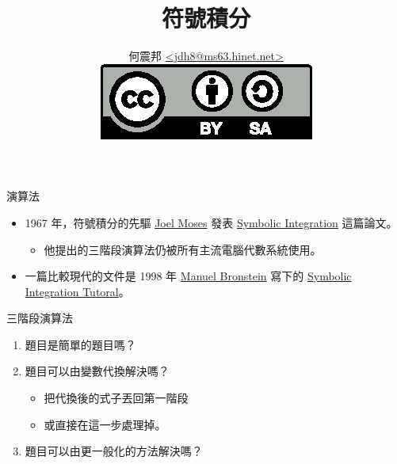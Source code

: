 \documentclass{beamer}
\theoremstyle{remark}
\begin{document}
\title{符號積分}
\author[何震邦]{何震邦 \href{mailto:jdh8@ms63.hinet.net}{\textless jdh8@ms63.hinet.net\textgreater}\\
    \href{http://creativecommons.org/licenses/by-sa/3.0/tw/deed.zh\textunderscore TW}{\includegraphics{by-sa.eps}}}

\maketitle

\begin{frame}{演算法}
  \begin{itemize}
    \item 1967 年，符號積分的先驅 \href{http://en.wikipedia.org/wiki/Joel\textunderscore Moses}{Joel Moses} 發表
      \href{http://www.softwarepreservation.org/projects/LISP/MIT/MIT-LCS-TR-047-corrected-ocr.pdf}{Symbolic Integration}
      這篇論文。
      \begin{itemize}
	\item 他提出的三階段演算法仍被所有主流電腦代數系統使用。
      \end{itemize}
    \item 一篇比較現代的文件是 1998 年
      \href{http://www-sop.inria.fr/cafe/Manuel.Bronstein/bronstein-eng.html}{Manuel Bronstein} 寫下的
      \href{http://www-sop.inria.fr/cafe/Manuel.Bronstein/publications/issac98.pdf}{Symbolic Integration Tutoral}。
  \end{itemize}
\end{frame}

\begin{frame}{三階段演算法}
  \begin{enumerate}
    \item 題目是簡單的題目嗎？
    \item 題目可以由變數代換解決嗎？
      \begin{itemize}
	\item 把代換後的式子丟回第一階段
	\item 或直接在這一步處理掉。
      \end{itemize}
    \item 題目可以由更一般化的方法解決嗎？
  \end{enumerate}
\end{frame}
\end{document}
